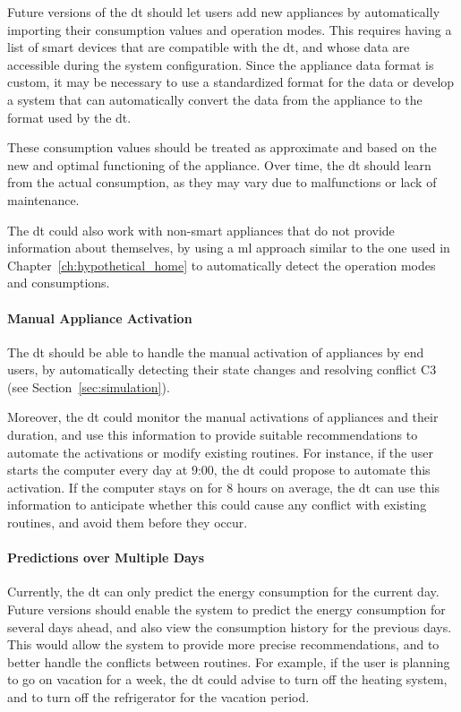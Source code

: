 Future versions of the \acrshort{dt} should let users add new appliances by automatically importing their consumption values and operation modes. This requires having a list of smart devices that are compatible with the \acrshort{dt}, and whose data are accessible during the system configuration. Since the appliance data format is custom, it may be necessary to use a standardized format for the data or develop a system that can automatically convert the data from the appliance to the format used by the \acrshort{dt}.

These consumption values should be treated as approximate and based on the new and optimal functioning of the appliance. Over time, the \acrshort{dt} should learn from the actual consumption, as they may vary due to malfunctions or lack of maintenance.

The \acrshort{dt} could also work with non-smart appliances that do not provide information about themselves, by using a \acrshort{ml} approach similar to the one used in Chapter~\ref{ch:hypothetical_home} to automatically detect the operation modes and consumptions.

\paragraph{Manual Appliance Activation}

The \acrshort{dt} should be able to handle the manual activation of appliances by end users, by automatically detecting their state changes and resolving conflict C3 (see Section~\ref{sec:simulation}).

Moreover, the \acrshort{dt} could monitor the manual activations of appliances and their duration, and use this information to provide suitable recommendations to automate the activations or modify existing routines. For instance, if the user starts the computer every day at 9:00, the \acrshort{dt} could propose to automate this activation. If the computer stays on for 8 hours on average, the \acrshort{dt} can use this information to anticipate whether this could cause any conflict with existing routines, and avoid them before they occur.

\paragraph{Predictions over Multiple Days}

Currently, the \acrshort{dt} can only predict the energy consumption for the current day. Future versions should enable the system to predict the energy consumption for several days ahead, and also view the consumption history for the previous days. This would allow the system to provide more precise recommendations, and to better handle the conflicts between routines. For example, if the user is planning to go on vacation for a week, the \acrshort{dt} could advise to turn off the heating system, and to turn off the refrigerator for the vacation period.

